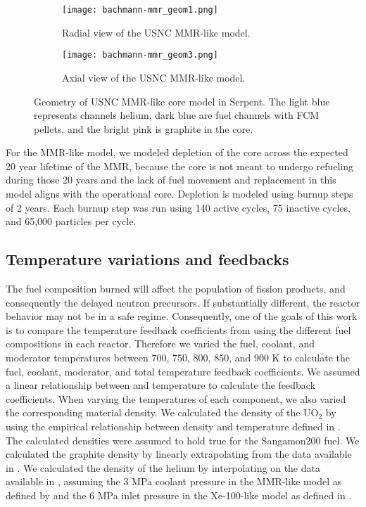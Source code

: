 \begin{figure}
        \begin{subfigure}{0.48\textwidth}
                \centering
                \texttt{[image: bachmann-mmr\_geom1.png]}
                \caption{Radial view of the USNC MMR-like model.}
                \label{fig:mmr_radial}
        \end{subfigure}
        \hfill 
        \begin{subfigure}{0.48\textwidth}
                \centering
                \texttt{[image: bachmann-mmr\_geom3.png]}
                \caption{Axial view of the USNC MMR-like model.}
                \label{fig:mmr_axial}
        \end{subfigure}
        \caption{Geometry of USNC MMR-like core model in Serpent. The 
        light blue represents channels helium, dark blue are fuel 
        channels with \gls{FCM} pellets, and the bright pink is graphite in the core.}
        \label{fig:mmr_core}
\end{figure}

For the \gls{MMR}-like model, we modeled depletion of the core across the 
expected 20 year lifetime of the \gls{MMR}, because the core is not 
meant to undergo refueling during those 20 years and the lack of 
fuel movement and replacement in this model aligns with the operational 
core. Depletion is modeled using burnup steps of 2 years. Each burnup step 
was run using 140 active cycles, 75 inactive 
cycles, and 65,000 particles per cycle. 

\subsection{Temperature variations and feedbacks}
The fuel composition burned will affect the population of fission products, 
and consequently the delayed neutron precursors. If substantially different,
the reactor behavior may not be in a safe regime. Consequently, 
one of the goals of this work is to compare the temperature feedback 
coefficients from using the different fuel compositions in each 
reactor. Therefore we varied the fuel, coolant, and moderator temperatures 
between 700, 750, 800, 850, and 900 K to calculate the fuel, coolant, 
moderator, and total temperature feedback coefficients. We assumed a linear 
relationship between 
\keff and temperature to calculate the feedback coefficients. When varying the 
temperatures of each component, we also varied the corresponding material 
density. We calculated the 
density of the UO$_2$ by using the empirical relationship between density and 
temperature defined in \cite{fink_thermophysical_2000}. The calculated 
densities were assumed to hold true for the Sangamon200 fuel. 
We calculated the 
graphite density by linearly extrapolating from the data available in 
\cite{mceligot_thermal_nodate}. We calculated the density of the helium 
by interpolating on the data available in \cite{petersen_properties_nodate}, 
assuming the 3 MPa coolant pressure in the \gls{MMR}-like model as defined 
by \cite{noauthor_usnc_2021} and the 6 MPa inlet pressure in the 
Xe-100-like model as defined in \cite{mulder_overview_2021}. 

